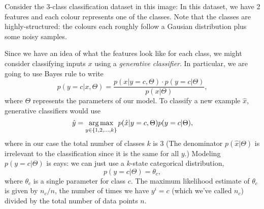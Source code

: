 \documentclass{article}
\begin{document}
Consider the 3-class classification dataset in this image:
In this dataset, we have 2 features and each colour represents one of the classes. Note that the classes are highly-structured: the colours each roughly follow a Gausian distribution plus some noisy samples.

Since we have an idea of what the features look like for each class, we might consider classifying  inputs $x$ using a \emph{generative classifier}. In particular, we are going to use Bayes rule to write
\[
p(y=c|x,\Theta) = \frac{p(x| y=c, \Theta) \cdot p(y=c|\Theta)}{p(x|\Theta)},
\]
where $\Theta$ represents the parameters of our model. To classify a new example $\hat{x}$, generative classifiers would use
\[
\hat{y} = \mathop{\rm arg\,max}_{y \in \{1,2,\dots,k\}} p(\hat{x}| y=c,\Theta)p(y=c|\Theta),
\]
where in our case the total number of classes $k$ is $3$ (The denominator $p(\hat{x}|\Theta)$ is irrelevant to the classification since it is the same for all $y$.)
Modeling $p(y=c|\Theta)$ is eays: we can just use a $k$-state categorical distribution,
\[
p(y = c | \Theta) = \theta_c,
\]
where $\theta_c$ is a single parameter for class $c$. The maximum likelihood estimate of $\theta_c$ is given by $n_c/n$, the number of times we have $y^i = c$ (which we've called $n_c$) divided by the total number of data points $n$.
\end{document}
